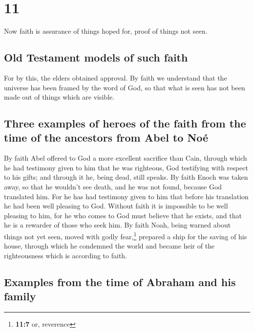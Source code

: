 \hypertarget{section-10}{%
\section{11}\label{section-10}}

 Now faith is assurance of things hoped for, proof of
things not seen.

\hypertarget{old-testament-models-of-such-faith}{%
\subsection{Old Testament models of such
faith}\label{old-testament-models-of-such-faith}}

 For by this, the elders obtained approval. 
By faith we understand that the universe has been framed by the word of
God, so that what is seen has not been made out of things which are
visible.

\hypertarget{three-examples-of-heroes-of-the-faith-from-the-time-of-the-ancestors-from-abel-to-nouxe9}{%
\subsection{Three examples of heroes of the faith from the time of the
ancestors from Abel to
Noé}\label{three-examples-of-heroes-of-the-faith-from-the-time-of-the-ancestors-from-abel-to-nouxe9}}

 By faith Abel offered to God a more excellent sacrifice
than Cain, through which he had testimony given to him that he was
righteous, God testifying with respect to his gifts; and through it he,
being dead, still speaks.  By faith Enoch was taken away,
so that he wouldn't see death, and he was not found, because God
translated him. For he has had testimony given to him that before his
translation he had been well pleasing to God.  Without
faith it is impossible to be well pleasing to him, for he who comes to
God must believe that he exists, and that he is a rewarder of those who
seek him.  By faith Noah, being warned about things not
yet seen, moved with godly fear,\footnote{\textbf{11:7} or, reverence}
prepared a ship for the saving of his house, through which he condemned
the world and became heir of the righteousness which is according to
faith.

\hypertarget{examples-from-the-time-of-abraham-and-his-family}{%
\subsection{Examples from the time of Abraham and his
family}\label{examples-from-the-time-of-abraham-and-his-family}}


